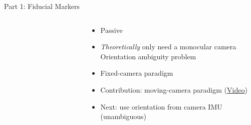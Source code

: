 \documentclass[aspectratio=169]{beamer}
\newif\ifpause
\newcommand{\mypause}{\ifpause \pause \fi}
\begin{document}
\begin{frame}{Part 1: Fiducial Markers}
\begin{columns}
\begin{column}{0.37\textwidth}
\begin{figure}[]
\begin{subfigure}[b]{0.45\linewidth}
			\label{figure:apriltag48h12}
		    \end{subfigure}
		    \label{figure:marker_setup}
		\end{figure}
        \end{column}
        \begin{column}{0.6\textwidth}
		\begin{itemize}
			\item Passive
			\item \emph{Theoretically} only need a monocular camera\mypause\\Orientation ambiguity problem
			\mypause
			\item Fixed-camera paradigm
			\mypause
			\item Contribution: moving-camera paradigm (\href{https://vimeo.com/664863992}{Video})
			\mypause
			\item Next: use orientation from camera IMU (unambiguous)
		\end{itemize}
        \end{column}
    \end{columns}
\end{frame}
\end{document}
